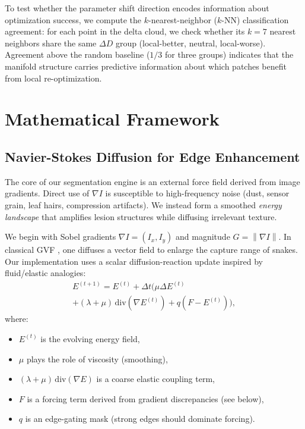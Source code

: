 \documentclass[journal]{IEEEtran}
\newcommand{\grad}{\nabla}
\newcommand{\lap}{\Delta}
\newcommand{\norm}[1]{\left\lVert #1 \right\rVert}
\begin{document}
To test whether the parameter shift direction encodes information about optimization success, we compute the $k$-nearest-neighbor ($k$-NN) classification agreement: for each point in the delta cloud, we check whether its $k{=}7$ nearest neighbors share the same $\Delta D$ group (local-better, neutral, local-worse). Agreement above the random baseline ($1/3$ for three groups) indicates that the manifold structure carries predictive information about which patches benefit from local re-optimization.

\section{Mathematical Framework}

\subsection{Navier-Stokes Diffusion for Edge Enhancement}
The core of our segmentation engine is an external force field derived from image gradients. Direct use of $\grad I$ is susceptible to high-frequency noise (dust, sensor grain, leaf hairs, compression artifacts). We instead form a smoothed \emph{energy landscape} that amplifies lesion structures while diffusing irrelevant texture.

We begin with Sobel gradients $\grad I = (I_x, I_y)$ and magnitude $G = \norm{\grad I}$. In classical GVF \cite{xu1998gvf}, one diffuses a vector field to enlarge the capture range of snakes. Our implementation uses a scalar diffusion-reaction update inspired by fluid/elastic analogies:
\begin{multline}
E^{(t+1)} = E^{(t)} + \Delta t \Big( \mu \lap E^{(t)} \\
 + (\lambda{+}\mu)\,\mathrm{div}(\grad E^{(t)}) + q(F {-} E^{(t)}) \Big),
\label{eq:diffusion_update}
\end{multline}
where:
\begin{itemize}
    \item $E^{(t)}$ is the evolving energy field,
    \item $\mu$ plays the role of viscosity (smoothing),
    \item $(\lambda+\mu)\,\mathrm{div}(\grad E)$ is a coarse elastic coupling term,
    \item $F$ is a forcing term derived from gradient discrepancies (see below),
    \item $q$ is an edge-gating mask (strong edges should dominate forcing).
\end{itemize}
\end{document}
